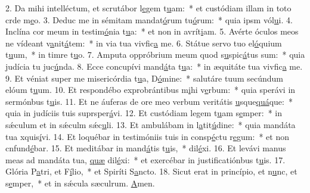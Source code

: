 2. Da mihi intelléctum, et scrutábor l\uline{e}gem t\uline{u}am:~* et custódiam illam in toto crde m\uline{e}o.
3. Deduc me in sémitam mandat\uline{ó}rum tu\uline{ó}rum:~* quia ipsm vól\uline{u}i.
4. Inclína cor meum in testim\uline{ó}nia t\uline{u}a:~* et non in avrít\uline{i}am.
5. Avérte óculos meos ne vídeant v\uline{a}nit\uline{á}tem:~* in via tua vivfic\uline{a} me.
6. Státue servo tuo el\uline{ó}quium t\uline{u}um,~* in timre t\uline{u}o.
7. Amputa oppróbrium meum quod s\uline{u}spic\uline{á}tus sum:~* quia judícia tu juc\uline{ú}nda.
8. Ecce concupívi mand\uline{á}ta t\uline{u}a:~* in æquitáte tua vivfic\uline{a} me.
9. Et véniat super me misericórdia t\uline{u}a, D\uline{ó}mine:~* salutáre tuum secúndum elóum t\uline{u}um.
10. Et respondébo exprobrántibus m\uline{i}hi v\uline{e}rbum:~* quia sperávi in sermónbus t\uline{u}is.
11. Et ne áuferas de ore meo verbum veritátis \uline{u}sque\uline{quá}que:~* quia in judíciis tuis suprsper\uline{á}vi.
12. Et custódiam legem t\uline{u}am s\uline{e}mper:~* in sǽculum et in sǽculm sǽc\uline{u}li.
13. Et ambulábam in l\uline{a}tit\uline{ú}dine:~* quia mandáta tua xquis\uline{í}vi.
14. Et loquébar in testimóniis tuis in consp\uline{é}ctu r\uline{e}gum:~* et non cnfund\uline{é}bar.
15. Et meditábar in mand\uline{á}tis t\uline{u}is,~*  dil\uline{é}xi.
16. Et levávi manus meas ad mandáta tua, \uline{quæ} dil\uline{é}xi:~* et exercébar in justificatiónbus t\uline{u}is.
17. Glória P\uline{a}tri, et F\uline{í}lio,~* et Spiríti S\uline{a}ncto.
18. Sicut erat in princípio, et n\uline{u}nc, et s\uline{e}mper,~* et in sǽcula sæculrum. \uline{A}men.
